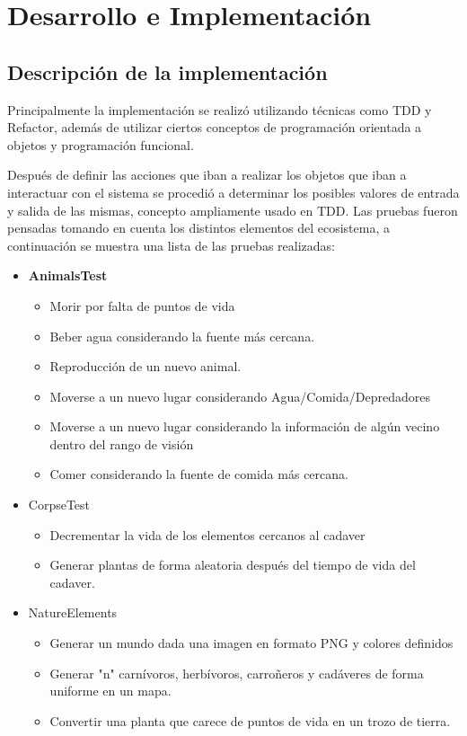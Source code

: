 \section{Desarrollo e Implementación}
  \subsection{Descripción de la implementación}    
    Principalmente la implementación se realizó utilizando técnicas como TDD y Refactor, además de utilizar ciertos conceptos de programación orientada a objetos y programación funcional.

    Después de definir las acciones que iban a realizar los objetos que iban a interactuar con el sistema se procedió a determinar los posibles valores de entrada y salida de las mismas, concepto ampliamente usado en TDD. Las pruebas fueron pensadas tomando en cuenta los distintos elementos del ecosistema, a continuación se muestra una lista de las pruebas realizadas:

      \begin{itemize}
        \item{\textbf{AnimalsTest}}
          \begin{itemize}
            \item{Morir por falta de puntos de vida}
            \item{Beber agua considerando la fuente más cercana.}
            \item{Reproducción de un nuevo animal.}
            \item{Moverse a un nuevo lugar considerando Agua/Comida/Depredadores}
            \item{Moverse a un nuevo lugar considerando la información de algún vecino dentro del rango de visión}
            \item{Comer considerando la fuente de comida más cercana.}
          \end{itemize}
        \item{CorpseTest}
          \begin{itemize}
            \item{Decrementar la vida de los elementos cercanos al cadaver}            
            \item{Generar plantas de forma aleatoria después del tiempo de vida del cadaver.}
          \end{itemize}
        \item{NatureElements}
          \begin{itemize}
            \item{Generar un mundo dada una imagen en formato PNG y colores definidos}
            \item{Generar "n" carnívoros, herbívoros, carroñeros y cadáveres de forma uniforme en un mapa.}
            \item{Convertir una planta que carece de puntos de vida en un trozo de tierra.}
          \end{itemize}
      \end{itemize}      
    
